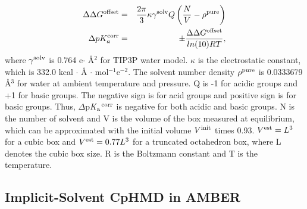 \documentclass[9pt,tutorial]{livecoms}
\newcommand{\pka}{p\textit{K}$_{\rm a}$}
\begin{document}
\begin{eqnarray}
\label{eq:pka_corr}
\Delta\Delta{G}^{\rm offset} &=&
\frac{2 \pi}{3} \kappa \gamma^{\rm solv} Q 
\left(\frac{N}{V}
- \rho^{\rm pure} \right) \\
\Delta pK_a^{\rm corr} &=& \pm \frac{\Delta\Delta{G}^{\rm offset}}{ln(10)RT},
\end{eqnarray}
where $\gamma^{\rm solv}$ is 0.764 e$\cdot$ {\AA$^2$} 
for TIP3P water model. 
$\kappa$ is the electrostatic constant, 
which is 332.0 kcal 
$\cdot$ {\AA} $\cdot$ mol$^{-1}$e$^{-2}$. 
The solvent number density $\rho^{\rm pure}$ is 
0.0333679 {\AA}$^3$ for water at ambient temperature 
and pressure. 
Q is -1 for acidic groups and +1 for basic groups. 
The negative sign is for acid groups and positive sign 
is for basic groups.
Thus, $\Delta$\pka$^{\rm corr}$ is negative for both 
acidic and basic groups. 
N is the number of solvent and V is the volume of the box 
measured at equilibrium, which can be approximated 
with the initial volume $V^{\rm init}$ times 0.93. $V^{\rm est} = L^3$ for a cubic box and $V^{\rm est} = 0.77L^3$ for a truncated octahedron box, where L denotes the cubic 
box size. R is the Boltzmann constant and T is the temperature.

\subsection{Implicit-Solvent CpHMD in AMBER} %
\end{document}
